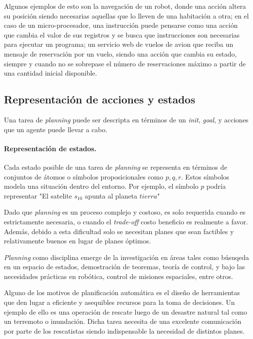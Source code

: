 Algunos ejemplos de esto son la navegación de un robot, donde una acción altera
su posición siendo necesarias aquellas que lo lleven de una habitación a otra;
en el caso de un micro-procesador, una instrucción puede pensarse como una
acción que cambia el valor de sus registros y se busca que instrucciones son
necesarias para ejecutar un programa; un servicio web de vuelos de avion que
reciba un mensaje de reservación por un vuelo, siendo una acción que cambia su
estado, siempre y cuando no se sobrepase el número de reservaciones máximo a
partir de una cantidad inicial disponible. \citep{Sandewall-2008-HandbookOK}

\subsection{Representación de acciones y estados}

Una tarea de \emph{planning} puede ser descripta en términos de un \emph{init},
\emph{goal}, y acciones que un agente puede llevar a cabo.

\paragraph{Representación de estados.} Cada estado posible de una tarea de
\emph{planning} se representa en términos de conjuntos de átomos o símbolos
proposicionales como $p, q, r$. Estos símbolos modela una situación dentro del
entorno. Por ejemplo, el símbolo $p$ podría representar "El satelite $s_{10}$
apunta al planeta $tierra$"


Dado que \emph{planning} es un proceso complejo y costoso, es solo requerida
cuando es estrictamente necesaria, o cuando el \emph{trade-off} costo beneficio
es realmente a favor. Además, debido a esta dificultad solo se necesitan planes
que sean factibles y relativamente buenos en lugar de planes óptimos.

\emph{Planning} como disciplina emerge de la investigación en áreas tales como
búsuqeda en un espacio de estados, demostración de teoremas, teoría de control,
y bajo las necesidades prácticas en robótica, control de misiones espaciales,
entre otros.

Alguno de los motivos de planificación automática es el diseño de herramientas
que den lugar a eficiente y asequibles recursos para la toma de decisiones. Un
ejemplo de ello es una operación de rescate luego de un desastre natural tal
como un terremoto o inundación. Dicha tarea necesita de una excelente
comunicación por parte de los rescatistas siendo indispensable la necesidad de
distintos planes.